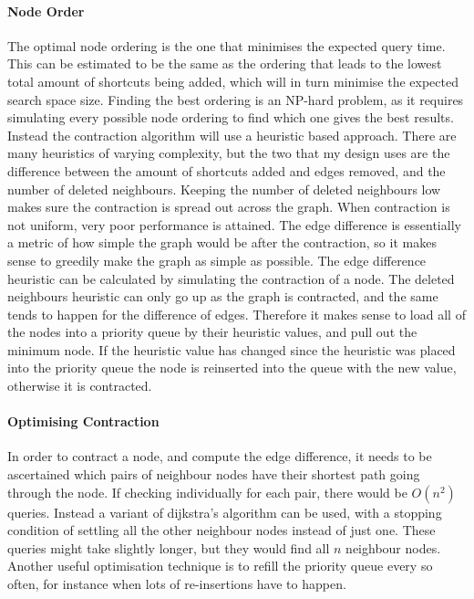 \documentclass[11pt,twoside,a4paper]{report}
\begin{document}
\paragraph{Node Order}
The optimal node ordering is the one that minimises the expected query time. This can be estimated to be the same as the ordering that leads to the lowest total amount of shortcuts being added, which will in turn minimise the expected search space size.
Finding the best ordering is an NP-hard problem, as it requires simulating every possible node ordering to find which one gives the best results. Instead the contraction algorithm will use a heuristic based approach. There are many heuristics of varying complexity, but the 
two that my design uses are the difference between the amount of shortcuts added and edges removed, and the number of deleted neighbours. Keeping the number of deleted neighbours low makes sure the contraction is spread out across the graph. When contraction is not uniform, very poor performance is attained.
The edge difference is essentially a metric of how simple the graph would be after the contraction, so it makes sense to greedily make the graph as simple as possible. The edge difference heuristic can be calculated by simulating the contraction of a node.
The deleted neighbours heuristic can only go up as the graph is contracted, and the same tends to happen for the difference of edges. Therefore it makes sense to load all of the nodes into a priority queue by their heuristic values,
and pull out the minimum node. If the heuristic value has changed since the heuristic was placed into the priority queue the node is reinserted into the queue with the new value, otherwise it is contracted.    
\paragraph{Optimising Contraction}
In order to contract a node, and compute the edge difference, it needs to be ascertained which pairs of neighbour nodes have their shortest path going through the node. If checking individually for each pair, there would be $O(n^2)$ queries.
Instead a variant of dijkstra's algorithm can be used, with a stopping condition of settling all the other neighbour nodes instead of just one. These queries might take slightly longer, but they would find all $n$ neighbour nodes.
Another useful optimisation technique is to refill the priority queue every so often, for instance when lots of re-insertions have to happen. 
\end{document}
